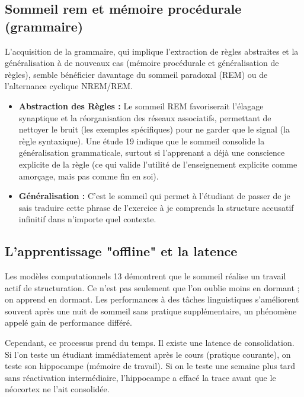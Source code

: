 \subsection{Sommeil rem et mémoire procédurale (grammaire)}

L'acquisition de la grammaire, qui implique l'extraction de règles abstraites et la généralisation à
de nouveaux cas (mémoire procédurale et généralisation de règles), semble bénéficier davantage du
sommeil paradoxal (REM) ou de l'alternance cyclique NREM/REM.\cite{III-3-1-ref17}

\begin{itemize}\item \textbf{Abstraction des Règles :} Le sommeil REM favoriserait l'élagage synaptique et la réorganisation des réseaux associatifs, permettant de \og nettoyer\fg{} le bruit (les exemples spécifiques) pour ne garder que le signal (la règle syntaxique). Une étude 19 indique que le sommeil consolide la généralisation grammaticale, surtout si l'apprenant a déjà une conscience explicite de la règle (ce qui valide l'utilité de l'enseignement explicite comme amorçage, mais pas comme fin en soi).\item \textbf{Généralisation :} C'est le sommeil qui permet à l'étudiant de passer de \og je sais traduire cette phrase de l'exercice\fg{} à \og je comprends la structure accusatif \+ infinitif dans n'importe quel contexte\fg{}.\cite{III-3-1-ref20}\end{itemize}

\subsection{L'apprentissage "offline" et la latence}

Les modèles computationnels 13 démontrent que le sommeil réalise un travail actif de structuration.
Ce n'est pas seulement que l'on oublie moins en dormant ; on apprend en dormant. Les performances à
des tâches linguistiques s'améliorent souvent après une nuit de sommeil sans pratique
supplémentaire, un phénomène appelé \og gain de performance différé\fg{}.

Cependant, ce processus prend du temps. Il existe une \og latence de consolidation\fg{}. Si l'on
teste un étudiant immédiatement après le cours (pratique courante), on teste son hippocampe (mémoire
de travail). Si on le teste une semaine plus tard sans réactivation intermédiaire, l'hippocampe a
effacé la trace avant que le néocortex ne l'ait consolidée.



